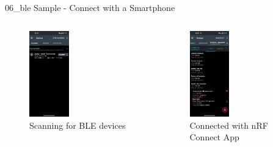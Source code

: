 \documentclass[10pt, aspectratio=169]{beamer}
\begin{document}
\begin{frame}[fragile]{06\_ble Sample - Connect with a Smartphone}
  \begin{columns}
    \begin{column}{0.5\textwidth}
      \begin{figure}
        \includegraphics[width=0.4\textwidth]{images/nrf_connect_scan.png}
        \caption*{Scanning for BLE devices}
      \end{figure}
    \end{column}
    \begin{column}{0.5\textwidth}
      \begin{figure}
        \includegraphics[width=0.4\textwidth]{images/nrf_connect_ble_connected.png}
        \caption*{Connected with nRF Connect App}
      \end{figure}
    \end{column}
  \end{columns}
\end{frame}
\end{document}
